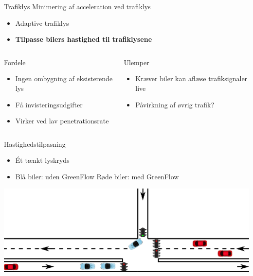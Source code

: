 \begin{frame}{Trafiklys}
Minimering af acceleration ved trafiklys
\begin{itemize}
\item Adaptive trafiklys
\item \textbf{Tilpasse bilers hastighed til trafiklysene}
\end{itemize}


\begin{center}
\begin{columns}
\begin{column}{0.4\textwidth}
Fordele
\begin{itemize}
\item Ingen ombygning af eksisterende lys
\item Få invisteringsudgifter 
\item Virker ved lav penetrationsrate
\end{itemize}
\end{column}

\begin{column}{0.5\textwidth}
Ulemper
\begin{itemize}
\item Kræver biler kan aflæse trafiksignaler live
\item Påvirkning af øvrig trafik?
\end{itemize}
\vspace{8mm}
\end{column}
\end{columns}
\end{center}
\end{frame}

\begin{frame}{Hastighedstilpasning}
\begin{itemize}
\item Ét tænkt lyskryds
\item Blå biler: uden GreenFlow \hspace{8mm} Røde biler: med GreenFlow
\end{itemize}
\vspace{3mm}
\includegraphics[width=1\textwidth]{../images/introNetworkSimple.png}
\end{frame}

